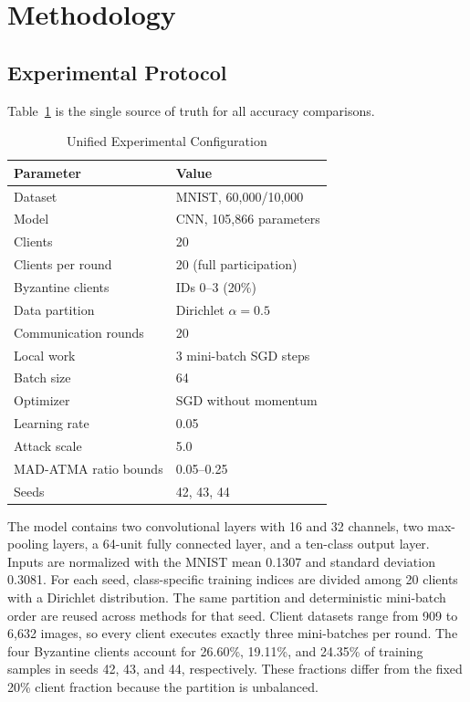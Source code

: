 \documentclass[10pt,letterpaper]{article}
\begin{document}
\section{Methodology}

\subsection{Experimental Protocol}

Table~\ref{tab:configuration} is the single source of truth for all accuracy
comparisons.

\begin{table}[t]
\caption{Unified Experimental Configuration}
\label{tab:configuration}
\centering
\small
\begin{tabular}{ll}
\toprule
Parameter & Value\\
\midrule
Dataset & MNIST, 60,000/10,000~\cite{lecun1998}\\
Model & CNN, 105,866 parameters\\
Clients & 20\\
Clients per round & 20 (full participation)\\
Byzantine clients & IDs 0--3 (20\%)\\
Data partition & Dirichlet $\alpha=0.5$\\
Communication rounds & 20\\
Local work & 3 mini-batch SGD steps\\
Batch size & 64\\
Optimizer & SGD without momentum\\
Learning rate & 0.05\\
Attack scale & 5.0\\
MAD-ATMA ratio bounds & 0.05--0.25\\
Seeds & 42, 43, 44\\
\bottomrule
\end{tabular}
\end{table}

The model contains two convolutional layers with 16 and 32 channels, two
max-pooling layers, a 64-unit fully connected layer, and a ten-class output
layer. Inputs are normalized with the MNIST mean 0.1307 and standard deviation
0.3081. For each seed, class-specific training indices are divided among 20
clients with a Dirichlet distribution. The same partition and deterministic
mini-batch order are reused across methods for that seed. Client datasets range
from 909 to 6,632 images, so every client executes exactly three mini-batches
per round. The four Byzantine clients account for 26.60\%, 19.11\%, and
24.35\% of training samples in seeds 42, 43, and 44, respectively. These
fractions differ from the fixed 20\% client fraction because the partition is
unbalanced.
\end{document}

